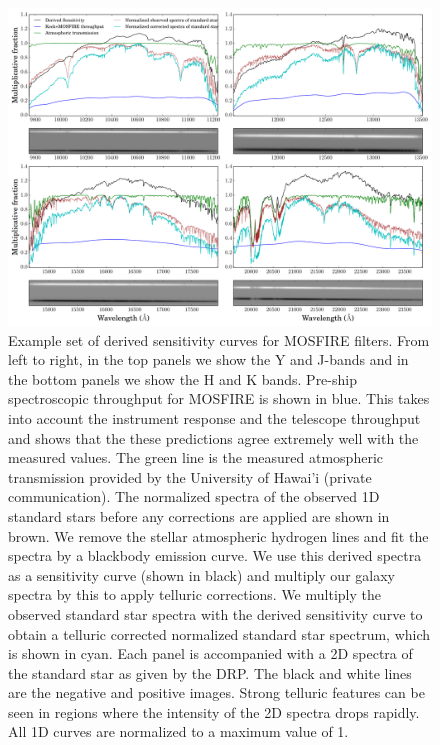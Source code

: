 \documentclass[iop]{emulateapj}
\begin{document}
\begin{figure}[h!]
\includegraphics[trim = 10 10 10 10, clip, scale=0.45]{figures/sensitivity.pdf}
\caption{Example set of derived sensitivity curves for MOSFIRE filters. From left to right, in the top panels we show the Y and J-bands and in the bottom panels we show the H and K bands. Pre-ship spectroscopic throughput for MOSFIRE is shown in blue. This takes into account the instrument response and the telescope throughput and \cite{McLean2012} shows that the these predictions agree extremely well with the measured values. The green line is the measured atmospheric transmission provided by the University of Hawai'i (private communication). 
The normalized spectra of the observed 1D standard stars before any corrections are applied are shown in brown. 
We remove the stellar atmospheric hydrogen lines and fit the spectra by a blackbody emission curve.
We use this derived spectra as a sensitivity curve (shown in black) and multiply our galaxy spectra by this to apply telluric corrections. 
We multiply the observed standard star spectra with the derived sensitivity curve to obtain a telluric corrected normalized standard star spectrum, which is shown in cyan. 
Each panel is accompanied with a 2D spectra of the standard star as given by the DRP. The black and white lines are the negative and positive images. Strong telluric features can be seen in regions where the intensity of the 2D spectra drops rapidly.
All 1D curves are normalized to a maximum value of 1.}
\label{fig:sensitivity}
\end{figure}


\clearpage
\end{document}

